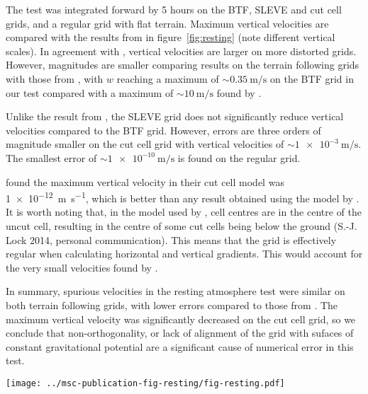 \documentclass[twocol]{ametsoc}
\begin{document}
The test was integrated forward by 5 hours on the BTF, SLEVE and cut cell grids, and a regular grid with flat terrain.  Maximum vertical velocities are compared with the results from \citet{klemp2011} in figure~\ref{fig:resting} (note different vertical scales).  In agreement with \citet{klemp2011}, vertical velocities are larger on more distorted grids.  However, magnitudes are smaller comparing results on the terrain following grids with those from \citet{klemp2011}, with $w$ reaching a maximum of \(\sim \SI{0.35}{\meter\per\second}\) on the BTF grid in our test compared with a maximum of \(\sim \SI{10}{\meter\per\second}\) found by \citet{klemp2011} .

Unlike the result from \citet{klemp2011}, the SLEVE grid does not significantly reduce vertical velocities compared to the BTF grid.  However, errors are three orders of magnitude smaller on the cut cell grid with vertical velocities of \(\sim \SI{1e-3}{\meter\per\second}\).  The smallest error of \(\sim \SI{1e-10}{\meter\per\second}\) is found on the regular grid.

\citet{good2014} found the maximum vertical velocity in their cut cell model was \SI{1e-12}{\meter\per\second}, which is better than any result obtained using the model by \citet{weller-shahrokhi2014}.  It is worth noting that, in the model used by \citet{good2014}, cell centres are in the centre of the uncut cell, resulting in the centre of some cut cells being below the ground (S.-J. Lock 2014, personal communication).  This means that the grid is effectively regular when calculating horizontal and vertical gradients.  This would account for the very small velocities found by \citet{good2014}.

In summary, spurious velocities in the resting atmosphere test were similar on both terrain following grids, with lower errors compared to those from \citet{klemp2011}.  The maximum vertical velocity was significantly decreased on the cut cell grid, so we conclude that non-orthogonality, or lack of alignment of the grid with sufaces of constant gravitational potential are a significant cause of numerical error in this test.

\begin{figure*}
	\centering
	\texttt{[image: ../msc-publication-fig-resting/fig-resting.pdf]}
%
	\caption{Maximum spurious vertical velocity, \(w\) (\si{\meter\per\second}), in the resting atmosphere test with results on (a) BTF, SLEVE, Hybrid Terrain Following (HTF) and Smoothed Terrain Following (STF) coordinates from \citet{klemp2011}, (b) BTF, SLEVE, cut cell and regular grids using the model from \citet{weller-shahrokhi2014}.  Note that vertical scales differ.}
	\label{fig:resting}
\end{figure*}
\end{document}

